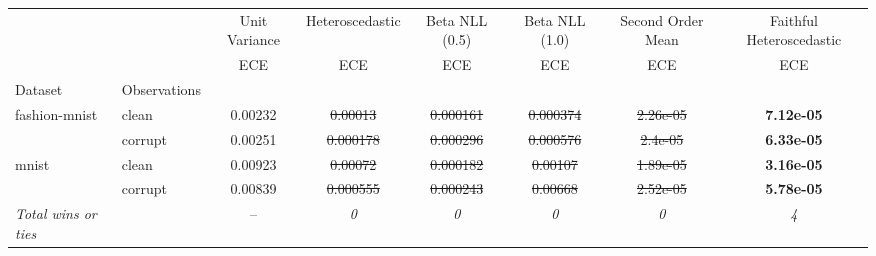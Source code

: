 \begin{tabular}{ll|c|c|c|c|c|c}
\toprule
{} & {} & {Unit Variance} & {Heteroscedastic} & {Beta NLL (0.5)} & {Beta NLL (1.0)} & {Second Order Mean} & {Faithful Heteroscedastic} \\
{} & {} & {ECE} & {ECE} & {ECE} & {ECE} & {ECE} & {ECE} \\
{Dataset} & {Observations} & {} & {} & {} & {} & {} & {} \\
\midrule
\multirow[t]{2}{*}{fashion-mnist} & clean & 0.00232 & \sout{0.00013} & \sout{0.000161} & \sout{0.000374} & \sout{2.26e-05} & \textbf{7.12e-05} \\
 & corrupt & 0.00251 & \sout{0.000178} & \sout{0.000296} & \sout{0.000576} & \sout{2.4e-05} & \textbf{6.33e-05} \\
\multirow[t]{2}{*}{mnist} & clean & 0.00923 & \sout{0.00072} & \sout{0.000182} & \sout{0.00107} & \sout{1.89e-05} & \textbf{3.16e-05} \\
 & corrupt & 0.00839 & \sout{0.000555} & \sout{0.000243} & \sout{0.00668} & \sout{2.52e-05} & \textbf{5.78e-05} \\
\textit{{Total wins or ties}} &  & -- & \textit{0} & \textit{0} & \textit{0} & \textit{0} & \textit{4} \\
\bottomrule
\end{tabular}
